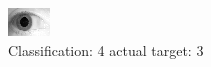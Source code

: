 \begin{figure}[h!]
\begin{center}
\includegraphics[width=0.60\columnwidth]{figures/ID1847_class_4_target_3.png}
\end{center}
\caption{ Classification: 4 actual target: 3}
\label{fig:ID1847_class_4_target_3}
\end{figure}
